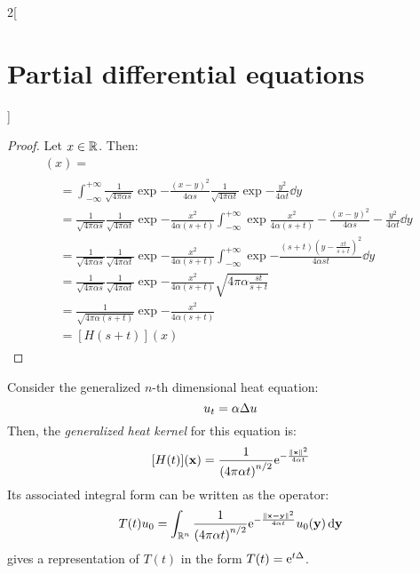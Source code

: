 \documentclass[../../../main_math.tex]{subfiles}
\begin{document}
\begin{multicols}{2}[\section{Partial differential equations}]
  \begin{proof}
    Let $x\in\mathbb{R}$. Then:
    \begin{multline*}
      [H(s)*H(t)](x) =       \\
      \begin{aligned}
         & =\int_{-\infty}^{+\infty}\frac{1}{\sqrt{4\pi\alpha s}}\exp{-\frac{{(x-y)}^2}{4\alpha s}}\frac{1}{\sqrt{4\pi\alpha t}}\exp{-\frac{y^2}{4\alpha t}}\dd{y}                                                    \\
         & =\frac{1}{\sqrt{4\pi\alpha s}}\frac{1}{\sqrt{4\pi\alpha t}}\exp{-\frac{x^2}{4\alpha (s+t)}}\int_{-\infty}^{+\infty}\exp{\frac{x^2}{4\alpha (s+t)}-\frac{{(x-y)}^2}{4\alpha s}-\frac{y^2}{4\alpha t}}\dd{y} \\
         & =\frac{1}{\sqrt{4\pi\alpha s}}\frac{1}{\sqrt{4\pi\alpha t}}\exp{-\frac{x^2}{4\alpha (s+t)}}\int_{-\infty}^{+\infty}\exp{-\frac{(s+t){\left(y-\frac{xt}{s+t}\right)}^2}{4\alpha st}}\dd{y}                  \\
         & =\frac{1}{\sqrt{4\pi\alpha s}}\frac{1}{\sqrt{4\pi\alpha t}}\exp{-\frac{x^2}{4\alpha (s+t)}}\sqrt{4\pi\alpha \frac{st}{s+t}}                                                                                \\
         & =\frac{1}{\sqrt{4\pi\alpha (s+t)}}\exp{-\frac{x^2}{4\alpha (s+t)}}                                                                                                                                         \\
         & = [H(s+t)](x)
      \end{aligned}
    \end{multline*}
  \end{proof}
  \begin{proposition}
    Consider the generalized $n$-th dimensional heat equation:
    \begin{equation}
      u_t=\alpha\Delta u
    \end{equation} Then, the \emph{generalized heat kernel} for this equation is: $$[H(t)](\boldsymbol{\mathrm{x}}) = \frac{1}{{(4\pi\alpha t)}^{n/2}}\mathrm{e}^{-\frac{\left\|\boldsymbol{\mathrm{x}}\right\|^2}{4\alpha t}}$$ Its associated integral form can be written as the operator:
    \begin{equation}\label{PDE:Toperator}
      T(t)u_0=\int_{\mathbb{R}^n}\frac{1}{{(4\pi\alpha t)}^{n/2}}\mathrm{e}^{-\frac{\left\|\boldsymbol{\mathrm{x-y}}\right\|^2}{4\alpha t}}u_0(\boldsymbol{\mathrm{y}})\dd{\boldsymbol{\mathrm{y}}}
    \end{equation}
     gives a representation of $T(t)$ in the form $T(t)=\mathrm{e}^{t\Delta}$.

\end{proposition}
\end{multicols}
\end{document}
